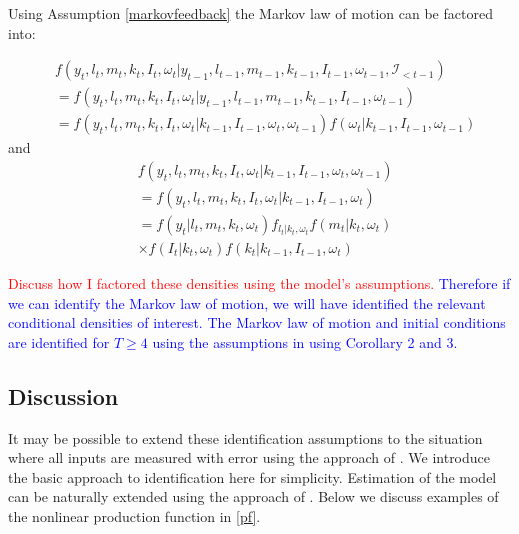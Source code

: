 \documentclass{article}
\begin{document}
Using Assumption \eqref{markovfeedback} the Markov law of motion can be factored into:

\begin{equation*}
    \begin{split}
        &f(y_{t}, l_{t}, m_{t}, k_{t}, I_{t}, \omega_{t}|y_{t-1}, l_{t-1}, m_{t-1}, k_{t-1}, I_{t-1}, \omega_{t-1}, \mathcal{I}_{<t-1})\\
        &=f(y_{t}, l_{t}, m_{t}, k_{t}, I_{t}, \omega_{t}|y_{t-1}, l_{t-1}, m_{t-1}, k_{t-1}, I_{t-1}, \omega_{t-1})\\
        &=f(y_{t}, l_{t}, m_{t}, k_{t}, I_{t}, \omega_{t}|k_{t-1}, I_{t-1}, \omega_{t}, \omega_{t-1})f(\omega_{t}|k_{t-1}, I_{t-1}, \omega_{t-1})
    \end{split}
\end{equation*} 
and 
\begin{equation*}
    \begin{split}
        &f(y_{t}, l_{t}, m_{t}, k_{t}, I_{t}, \omega_{t}|k_{t-1}, I_{t-1}, \omega_{t}, \omega_{t-1})\\
        &=f(y_{t}, l_{t}, m_{t}, k_{t}, I_{t}, \omega_{t}|k_{t-1}, I_{t-1}, \omega_{t})\\
        &=f(y_{t}|l_{t}, m_{t}, k_{t}, \omega_{t})f_{l_{t}|k_{t}, \omega_{t}}f(m_{t}|k_{t}, \omega_{t})\\
        &\times f(I_{t}|k_{t}, \omega_{t})f(k_{t}|k_{t-1}, I_{t-1}, \omega_{t})
    \end{split}
\end{equation*} 

\textcolor{red}{Discuss how I factored these densities using the model's assumptions.} \textcolor{blue}{Therefore if we can identify the Markov law of motion, we will have identified the relevant conditional densities of interest. The Markov law of motion and initial conditions are identified for $T\geq 4$ using the assumptions in \cite{Hu2012} using Corollary 2 and 3.}



\subsection{Discussion}
It may be possible to extend these identification assumptions to the situation where all inputs are measured with error using the approach of \cite{Song2017}. We introduce the basic approach to identification here for simplicity. Estimation of the model can be naturally extended using the approach of \cite{Wei2009}. Below we discuss examples of the nonlinear production function in \eqref{pf}.
\end{document}
